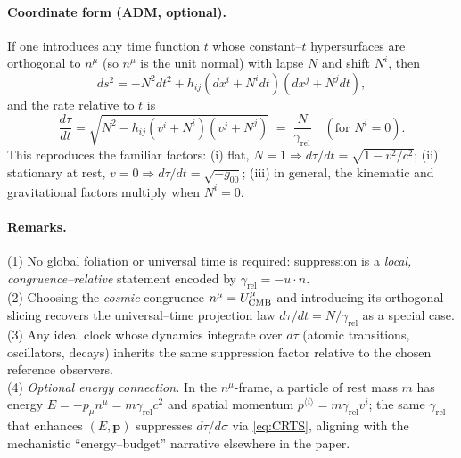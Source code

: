 \documentclass[12pt]{article}
\theoremstyle{plain}
\begin{document}
\paragraph{Coordinate form (ADM, optional).}
If one introduces any time function $t$ whose constant–$t$ hypersurfaces are orthogonal
to $n^\mu$ (so $n^\mu$ is the unit normal) with lapse $N$ and shift $N^i$, then
\[
ds^2=-N^2 dt^2 + h_{ij}(dx^i+N^i dt)(dx^j+N^j dt),
\]
and the rate relative to $t$ is
\[
\frac{d\tau}{dt}
= \sqrt{N^2 - h_{ij}(v^i+N^i)(v^j+N^j)}
\;=\; \frac{N}{\gamma_{\mathrm{rel}}}\quad(\text{for }N^i=0).
\]
This reproduces the familiar factors: (i) flat, $N=1 \Rightarrow d\tau/dt=\sqrt{1-v^2/c^2}$;
(ii) stationary at rest, $v=0 \Rightarrow d\tau/dt=\sqrt{-g_{00}}$; (iii) in general, the
kinematic and gravitational factors multiply when $N^i=0$.

\paragraph{Remarks.}
(1) No global foliation or universal time is required: suppression is a \emph{local,
congruence–relative} statement encoded by $\gamma_{\mathrm{rel}}=-u\!\cdot\! n$.\\

\noindent
(2) Choosing the \emph{cosmic} congruence $n^\mu=U^\mu_{\rm CMB}$ and introducing its
orthogonal slicing recovers the universal–time projection law $d\tau/dt = N/\gamma_{\mathrm{rel}}$
as a special case.\\

\noindent
(3) Any ideal clock whose dynamics integrate over $d\tau$ (atomic transitions, oscillators,
decays) inherits the same suppression factor relative to the chosen reference observers.\\

\noindent
(4) \emph{Optional energy connection.} In the $n^\mu$-frame, a particle of rest mass $m$
has energy $E=-p_\mu n^\mu = m \gamma_{\mathrm{rel}} c^2$ and spatial momentum
$p^{\langle i\rangle}=m\gamma_{\mathrm{rel}} v^i$; the same $\gamma_{\mathrm{rel}}$ that enhances
$(E,\mathbf{p})$ suppresses $d\tau/d\sigma$ via \eqref{eq:CRTS}, aligning with the
mechanistic “energy–budget” narrative elsewhere in the paper.

\newpage
\end{document}
